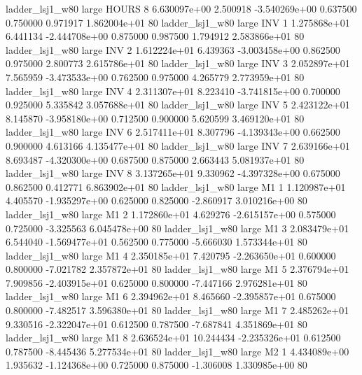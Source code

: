     ladder_lsj1_w80      large    HOURS                 8 6.630097e+00      2.500918 -3.540269e+00 0.637500 0.750000       0.971917 1.862004e+01 80
    ladder_lsj1_w80      large      INV                 1 1.275868e+01      6.441134 -2.444708e+00 0.875000 0.987500       1.794912 2.583866e+01 80
    ladder_lsj1_w80      large      INV                 2 1.612224e+01      6.439363 -3.003458e+00 0.862500 0.975000       2.800773 2.615786e+01 80
    ladder_lsj1_w80      large      INV                 3 2.052897e+01      7.565959 -3.473533e+00 0.762500 0.975000       4.265779 2.773959e+01 80
    ladder_lsj1_w80      large      INV                 4 2.311307e+01      8.223410 -3.741815e+00 0.700000 0.925000       5.335842 3.057688e+01 80
    ladder_lsj1_w80      large      INV                 5 2.423122e+01      8.145870 -3.958180e+00 0.712500 0.900000       5.620599 3.469120e+01 80
    ladder_lsj1_w80      large      INV                 6 2.517411e+01      8.307796 -4.139343e+00 0.662500 0.900000       4.613166 4.135477e+01 80
    ladder_lsj1_w80      large      INV                 7 2.639166e+01      8.693487 -4.320300e+00 0.687500 0.875000       2.663443 5.081937e+01 80
    ladder_lsj1_w80      large      INV                 8 3.137265e+01      9.330962 -4.397328e+00 0.675000 0.862500       0.412771 6.863902e+01 80
    ladder_lsj1_w80      large       M1                 1 1.120987e+01      4.405570 -1.935297e+00 0.625000 0.825000      -2.860917 3.010216e+00 80
    ladder_lsj1_w80      large       M1                 2 1.172860e+01      4.629276 -2.615157e+00 0.575000 0.725000      -3.325563 6.045478e+00 80
    ladder_lsj1_w80      large       M1                 3 2.083479e+01      6.544040 -1.569477e+01 0.562500 0.775000      -5.666030 1.573344e+01 80
    ladder_lsj1_w80      large       M1                 4 2.350185e+01      7.420795 -2.263650e+01 0.600000 0.800000      -7.021782 2.357872e+01 80
    ladder_lsj1_w80      large       M1                 5 2.376794e+01      7.909856 -2.403915e+01 0.625000 0.800000      -7.447166 2.976281e+01 80
    ladder_lsj1_w80      large       M1                 6 2.394962e+01      8.465660 -2.395857e+01 0.675000 0.800000      -7.482517 3.596380e+01 80
    ladder_lsj1_w80      large       M1                 7 2.485262e+01      9.330516 -2.322047e+01 0.612500 0.787500      -7.687841 4.351869e+01 80
    ladder_lsj1_w80      large       M1                 8 2.636524e+01     10.244434 -2.235326e+01 0.612500 0.787500      -8.445436 5.277534e+01 80
    ladder_lsj1_w80      large       M2                 1 4.434089e+00      1.935632 -1.124368e+00 0.725000 0.875000      -1.306008 1.330985e+00 80
